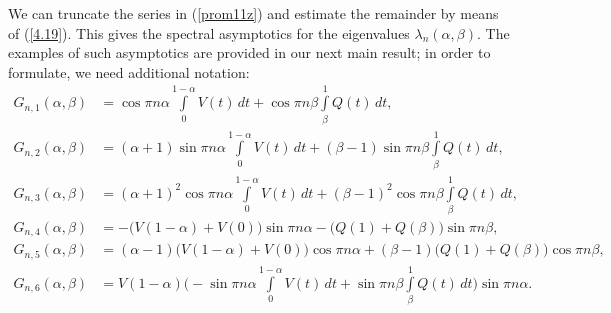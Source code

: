 \documentclass[10pt, a4paper]{article}
\theoremstyle{plain}
\theoremstyle{definition}
\numberwithin{equation}{section}
\def\l{\lambda}
\def\a{\alpha}
\def\b{\beta}
\begin{document}
We can truncate the series in (\ref{prom11z}) and estimate the remainder by means of (\ref{4.19}). This gives the spectral asymptotics for the eigenvalues $\l_n(\a,\b).$ The examples of such asymptotics are provided in our next main result; in order to formulate, we need additional notation:
\begin{equation}\label{Gnj}
\begin{aligned}
G_{n, 1}(\alpha, \beta) &= \cos\pi n\alpha\int\limits_0^{1-\alpha}V(t)\,dt+\cos\pi n\beta\int\limits_\beta^{1}Q(t)\,dt, \\
G_{n, 2}(\alpha, \beta) &= (\alpha+1)\sin\pi n\alpha\int\limits_0^{1-\alpha}V(t)\,dt+(\beta-1)\sin\pi n\beta\int\limits_\beta^{1}Q(t)\,dt, \\
G_{n, 3}(\alpha, \beta) &= (\alpha+1)^2\cos\pi n\alpha\int\limits_0^{1-\alpha}V(t)\,dt+(\beta-1)^2\cos\pi n\beta\int\limits_\beta^{1}Q(t)\,dt,\\
G_{n, 4}(\alpha, \beta) &= -\big(V(1-\alpha)+V(0)\big)\sin\pi n\alpha-\big(Q(1)+Q(\beta)\big)\sin\pi n\beta, \\
G_{n, 5}(\alpha, \beta) &= (\alpha-1)\big(V(1-\alpha)+V(0)\big)\cos\pi n\alpha+(\beta-1)\big(Q(1)+Q(\beta)\big)\cos\pi n\beta, \\
G_{n, 6}(\alpha, \beta) &= V(1-\alpha)\bigg(-\sin\pi n\alpha\int\limits_0^{1-\alpha}V(t)\,dt
+\sin\pi n\beta\int\limits_\beta^{1}Q(t)\,dt\bigg)\sin\pi n\alpha.
\end{aligned}
\end{equation}
\end{document}
